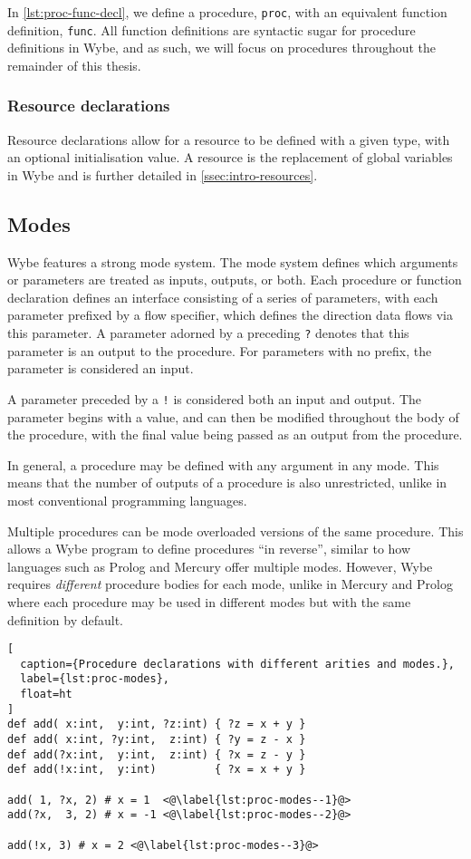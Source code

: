 In \cref{lst:proc-func-decl}, we define a procedure, \texttt{proc}, with an equivalent function definition, \texttt{func}. All function definitions are syntactic sugar for procedure definitions in Wybe, and as such, we will focus on procedures throughout the remainder of this thesis.

\subsubsection*{Resource declarations}

Resource declarations allow for a resource to be defined with a given type, with an optional initialisation value. A resource is the replacement of global variables in Wybe and is further detailed in \cref{ssec:intro-resources}.

\subsection{Modes}

Wybe features a strong mode system. The mode system defines which arguments or parameters are treated as inputs, outputs, or both. Each procedure or function declaration defines an interface consisting of a series of parameters, with each parameter prefixed by a flow specifier, which defines the direction data flows via this parameter. A parameter adorned by a preceding \texttt{?} denotes that this parameter is an output to the procedure. For parameters with no prefix, the parameter is considered an input.

A parameter preceded by a \texttt{!} is considered both an input and output. The parameter begins with a value, and can then be modified throughout the body of the procedure, with the final value being passed as an output from the procedure.

In general, a procedure may be defined with any argument in any mode. This means that the number of outputs of a procedure is also unrestricted, unlike in most conventional programming languages.

Multiple procedures can be mode overloaded versions of the same procedure. This allows a Wybe program to define procedures ``in reverse'', similar to how languages such as Prolog and Mercury offer multiple modes. However, Wybe requires \textit{different} procedure bodies for each mode, unlike in Mercury and Prolog where each procedure may be used in different modes but with the same definition by default.

\begin{lstlisting}[
  caption={Procedure declarations with different arities and modes.},
  label={lst:proc-modes},
  float=ht
]
def add( x:int,  y:int, ?z:int) { ?z = x + y }
def add( x:int, ?y:int,  z:int) { ?y = z - x }
def add(?x:int,  y:int,  z:int) { ?x = z - y }
def add(!x:int,  y:int)         { ?x = x + y }

add( 1, ?x, 2) # x = 1  <@\label{lst:proc-modes--1}@>
add(?x,  3, 2) # x = -1 <@\label{lst:proc-modes--2}@>

add(!x, 3) # x = 2 <@\label{lst:proc-modes--3}@>
\end{lstlisting}

